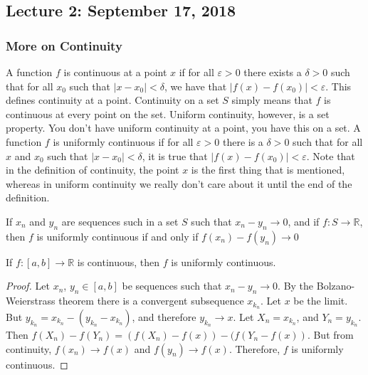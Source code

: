 \documentclass[crop=false,class=article,oneside]{standalone}
\begin{document}
    \subsection{Lecture 2: September 17, 2018}
        \subsubsection{More on Continuity}
            A function $f$ is continuous at a point $x$ if
            for all $\varepsilon>0$ there exists a $\delta>0$
            such that for all $x_{0}$ such that
            $|x-x_{0}|<\delta$, we have that
            $|f(x)-f(x_{0})|<\varepsilon$. This defines
            continuity at a point. Continuity on a set
            $S$ simply means that $f$ is continuous
            at every point on the set. Uniform continuity,
            however, is a set property. You don't have
            uniform continuity at a point, you have this
            on a set. A function $f$ is uniformly continuous
            if for all $\varepsilon>0$ there is a $\delta>0$
            such that for all $x$ and $x_{0}$ such that
            $|x-x_{0}|<\delta$, it is true that
            $|f(x)-f(x_{0})|<\varepsilon$. Note that in
            the definition of continuity, the point $x$
            is the first thing that is mentioned, whereas in
            uniform continuity we really don't care about it
            until the end of the definition.
            \begin{theorem}
                If $x_{n}$ and $y_{n}$ are sequences such
                in a set $S$ such that $x_{n}-y_{n}\rightarrow{0}$,
                and if $f:{S}\rightarrow\mathbb{R}$, then
                $f$ is uniformly continuous if and only if
                $f(x_{n})-f(y_{n})\rightarrow{0}$
            \end{theorem}
            \begin{theorem}
                If $f:[a,b]\rightarrow\mathbb{R}$ is continuous,
                then $f$ is uniformly continuous.
            \end{theorem}
            \begin{proof}
                Let $x_{n}$, $y_{n}\in[a,b]$ be sequences such
                that $x_{n}-y_{n}\rightarrow{0}$. By the
                Bolzano-Weierstrass theorem there is a
                convergent subsequence $x_{k_{n}}$. Let $x$
                be the limit. But
                $y_{k_{n}}=x_{k_{n}}-(y_{k_{n}}-x_{k_{n}})$,
                and therefore $y_{k_{n}}\rightarrow{x}$.
                Let $X_{n}=x_{k_{n}}$, and $Y_{n}=y_{k_{n}}$.
                Then
                $f(X_{n})-f(Y_{n})%
                 =(f(X_{n})-f(x))-(f(Y_{n}-f(x))$.
                But from continuity, $f(x_{n})\rightarrow{f(x)}$
                and $f(y_{n})\rightarrow{f(x)}$. Therefore, $f$
                is uniformly continuous.
            \end{proof}
\end{document}
